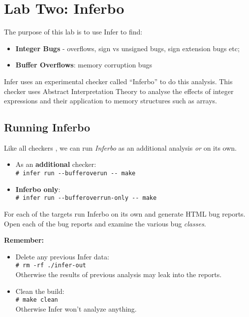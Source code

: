 \section{Lab Two: Inferbo}

The purpose of this lab is to use Infer to find:
\begin{itemize}
	\itemsep0em
	\item \textbf{Integer Bugs} - overflows, sign vs unsigned bugs, sign extension bugs etc;
	\item \textbf{Buffer Overflows}: memory corruption bugs	
\end{itemize}

Infer uses an experimental checker called ``Inferbo'' to do this analysis. 
This checker uses Abstract Interpretation Theory to analyse the effects of integer expressions
and their application to memory structures such as arrays.

\subsection{Running Inferbo}

Like all checkers , we can run \textit{Inferbo} as an additional analysis \textit{or} on its own.

\begin{itemize}
	\item As an \textbf{additional} checker: \\
	\verb|# infer run --bufferoverun -- make |
	\item \textbf{Inferbo only}:\\
	\verb|# infer run --bufferoverrun-only -- make |	
\end{itemize}


\vspace{0.5cm}
For each of the targets run Inferbo on its own and generate HTML bug reports.
Open each of the bug reports and examine the various bug \textit{classes}.

\textbf{Remember: }
\begin{itemize}
	\item Delete any previous Infer data:\\
	\verb|# rm -rf ./infer-out| \\
	Otherwise the results of previous analysis may leak into the reports.
	\item Clean the build:\\
	\verb|# make clean|\\
    Otherwise Infer won't analyze anything.
\end{itemize}

